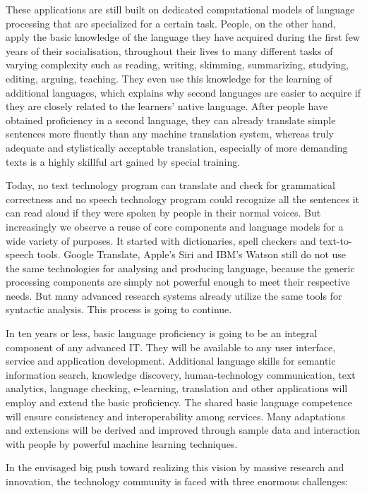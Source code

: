 \documentclass[10pt, plain]{../../metanetpaper}
\begin{document}
\begin{multicols}{2}
These applications are still built on dedicated computational models of language processing that are specialized for a certain task. People, on the other hand, apply the basic knowledge of the language they have acquired during the first few years of their socialisation, throughout their lives to many different tasks of varying complexity such as reading, writing, skimming, summarizing, studying, editing, arguing, teaching. They even use this knowledge for the learning of additional languages, which explains why second languages are easier to acquire if they are closely related to the learners' native language. After people have obtained proficiency in a second language, they can already translate simple sentences more fluently than any machine translation system, whereas truly adequate and stylistically acceptable translation, especially of more demanding texts is a highly skillful art gained by special training.

Today, no text technology program can translate and check for grammatical correctness and no speech technology program could recognize all the sentences it can read aloud if they were spoken by people in their normal voices. But increasingly we observe a reuse of core components and language models for a wide variety of purposes. It started with dictionaries, spell checkers and text-to-speech tools. Google Translate, Apple's Siri and IBM's Watson still do not use the same technologies for analysing and producing language, because the generic processing components are simply not powerful enough to meet their respective needs. But many advanced research systems already utilize the same tools for syntactic analysis. This process is going to continue.

In ten years or less, basic language proficiency is going to be an integral component of any advanced IT. They will be available to any user interface, service and application development. Additional language skills for semantic information search, knowledge discovery, human-technology communication, text analytics, language checking, e-learning, translation and other applications will employ and extend the basic proficiency. The shared basic language competence will ensure consistency and interoperability among services. Many adaptations and extensions will be derived and improved through sample data and interaction with people by powerful machine learning techniques.

In the envisaged big push toward realizing this vision by massive research and innovation, the technology community is faced with three enormous challenges:


\end{multicols}
\end{document}
